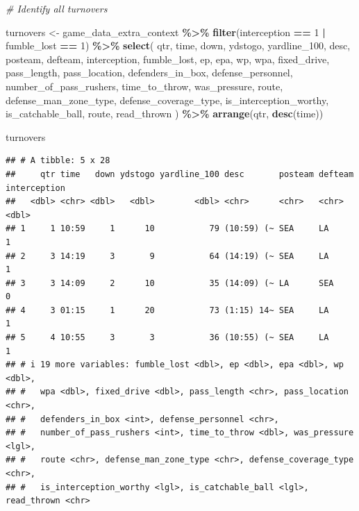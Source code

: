\documentclass[
]{article}
\newenvironment{Shaded}{\begin{snugshade}}{\end{snugshade}}
\newcommand{\CommentTok}[1]{\textcolor[rgb]{0.56,0.35,0.01}{\textit{#1}}}
\newcommand{\DecValTok}[1]{\textcolor[rgb]{0.00,0.00,0.81}{#1}}
\newcommand{\FunctionTok}[1]{\textcolor[rgb]{0.13,0.29,0.53}{\textbf{#1}}}
\newcommand{\NormalTok}[1]{#1}
\newcommand{\OtherTok}[1]{\textcolor[rgb]{0.56,0.35,0.01}{#1}}
\newcommand{\SpecialCharTok}[1]{\textcolor[rgb]{0.81,0.36,0.00}{\textbf{#1}}}
\begin{document}
\begin{Shaded}
\begin{Highlighting}[]
\CommentTok{\# Identify all turnovers}

\NormalTok{turnovers }\OtherTok{\textless{}{-}}\NormalTok{ game\_data\_extra\_context }\SpecialCharTok{\%\textgreater{}\%}
  \FunctionTok{filter}\NormalTok{(interception }\SpecialCharTok{==} \DecValTok{1} \SpecialCharTok{|}\NormalTok{ fumble\_lost }\SpecialCharTok{==} \DecValTok{1}\NormalTok{) }\SpecialCharTok{\%\textgreater{}\%}
  \FunctionTok{select}\NormalTok{(}
\NormalTok{    qtr, time, down, ydstogo, yardline\_100, }
\NormalTok{    desc, posteam, defteam,}
\NormalTok{    interception, fumble\_lost,}
\NormalTok{    ep, epa, wp, wpa, fixed\_drive,}
\NormalTok{    pass\_length, pass\_location,}
\NormalTok{    defenders\_in\_box, defense\_personnel, }
\NormalTok{    number\_of\_pass\_rushers, time\_to\_throw,}
\NormalTok{    was\_pressure, route, defense\_man\_zone\_type,}
\NormalTok{    defense\_coverage\_type, is\_interception\_worthy,}
\NormalTok{    is\_catchable\_ball,}
\NormalTok{    route, read\_thrown}
\NormalTok{  ) }\SpecialCharTok{\%\textgreater{}\%}
  \FunctionTok{arrange}\NormalTok{(qtr, }\FunctionTok{desc}\NormalTok{(time))}

\NormalTok{turnovers}
\end{Highlighting}
\end{Shaded}

\begin{verbatim}
## # A tibble: 5 x 28
##     qtr time   down ydstogo yardline_100 desc       posteam defteam interception
##   <dbl> <chr> <dbl>   <dbl>        <dbl> <chr>      <chr>   <chr>          <dbl>
## 1     1 10:59     1      10           79 (10:59) (~ SEA     LA                 1
## 2     3 14:19     3       9           64 (14:19) (~ SEA     LA                 1
## 3     3 14:09     2      10           35 (14:09) (~ LA      SEA                0
## 4     3 01:15     1      20           73 (1:15) 14~ SEA     LA                 1
## 5     4 10:55     3       3           36 (10:55) (~ SEA     LA                 1
## # i 19 more variables: fumble_lost <dbl>, ep <dbl>, epa <dbl>, wp <dbl>,
## #   wpa <dbl>, fixed_drive <dbl>, pass_length <chr>, pass_location <chr>,
## #   defenders_in_box <int>, defense_personnel <chr>,
## #   number_of_pass_rushers <int>, time_to_throw <dbl>, was_pressure <lgl>,
## #   route <chr>, defense_man_zone_type <chr>, defense_coverage_type <chr>,
## #   is_interception_worthy <lgl>, is_catchable_ball <lgl>, read_thrown <chr>
\end{verbatim}
\end{document}
